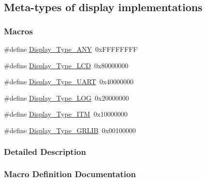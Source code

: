 \subsection{Meta-\/types of display implementations}
\label{group___d_i_s_p_l_a_y___t_y_p_e_s}
\subsubsection*{Macros}
\begin{DoxyCompactItemize}
\item 
\#define \hyperlink{group___d_i_s_p_l_a_y___t_y_p_e_s_ga18e865923359fab7d26c09dc169caf37}{Display\+\_\+\+Type\+\_\+\+A\+N\+Y}~0x\+F\+F\+F\+F\+F\+F\+F\+F
\item 
\#define \hyperlink{group___d_i_s_p_l_a_y___t_y_p_e_s_ga9b8f62fe443d3a584f598392d233f38c}{Display\+\_\+\+Type\+\_\+\+L\+C\+D}~0x80000000
\item 
\#define \hyperlink{group___d_i_s_p_l_a_y___t_y_p_e_s_ga0257ac5b377a67eb525400e4c2a4f0d0}{Display\+\_\+\+Type\+\_\+\+U\+A\+R\+T}~0x40000000
\item 
\#define \hyperlink{group___d_i_s_p_l_a_y___t_y_p_e_s_gaaf8a10cc8b8de9d38f144d44f968b1fc}{Display\+\_\+\+Type\+\_\+\+L\+O\+G}~0x20000000
\item 
\#define \hyperlink{group___d_i_s_p_l_a_y___t_y_p_e_s_gae19f6c6b10d4e3d491819fb02ae4c865}{Display\+\_\+\+Type\+\_\+\+I\+T\+M}~0x10000000
\item 
\#define \hyperlink{group___d_i_s_p_l_a_y___t_y_p_e_s_ga498ae390d2feea643ec3f23533859f35}{Display\+\_\+\+Type\+\_\+\+G\+R\+L\+I\+B}~0x00100000
\end{DoxyCompactItemize}


\subsubsection{Detailed Description}


\subsubsection{Macro Definition Documentation}
